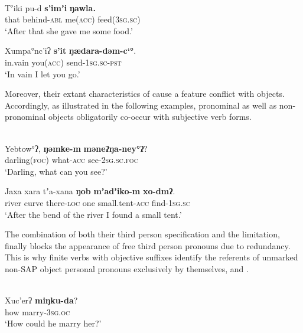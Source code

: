\documentclass[output=paper]{LSP/langsci}
\begin{document}
\ea \label{12-wr-ex:15}%
\\
\ea \label{12-wr-ex:15a}
\gll Tʼiki pu-d \textbf{s’imʼi} \textbf{ŋawla.}\\
 that behind-\textsc{abl} me(\textsc{acc)} feed\textsc{(3sg.sc)}\\
\glt  ‘After that she gave me some food.’

\ex  \label{12-wr-ex:15b}
\gll Xumpa°nc’iʔ \textbf{s’it} \textbf{ŋædara-dəm-c‘°}.\\
 in.vain you\textsc{(acc)} send-\textsc{1sg.sc-pst}\\
\glt ‘In vain I let you go.’
\z
\z

Moreover, their extant characteristics of  cause a feature conflict with  objects. Accordingly, as illustrated in the following examples, pronominal  as well as non-pronominal   objects obligatorily co-occur with subjective verb forms.

\ea\label{12-wr-ex:16}
\\
\ea\label{12-wr-ex:16a}
\gll  Yebtow°ʔ, \textbf{ŋəmke-m} \textbf{mǝneʔŋa-ney°ʔ}?\\
 darling(\textsc{foc)} what-\textsc{acc} see-\textsc{2sg.sc.foc}\\
\glt ‘Darling, what can you see?’

\ex\label{12-wr-ex:16b}
\gll  Jaxa xara tʼa-xana \textbf{ŋob} \textbf{mʼadʼiko-m} \textbf{xo-dmʔ}.\\
 river curve there-\textsc{loc} one small.tent\textsc{-acc} find-\textsc{1sg.sc}\\
\glt  ‘After the bend of the river I found a small tent.’
\z
\z

The combination of both their third person specification and the  limitation, finally blocks the appearance of free  third person pronouns due to redundancy. 
This is why finite verbs with objective suffixes identify the referents of unmarked non-SAP object personal pronouns exclusively by themselves, \cf {} and . 

\ea\label{12-wr-ex:17}
\\

\ea\label{12-wr-ex:17a}
\gll Xuc'erʔ \textbf{miŋku-da}?\\
 how marry-\textsc{3sg.oc}\\
\glt  ‘How could he marry her?’\\
\end{document}
